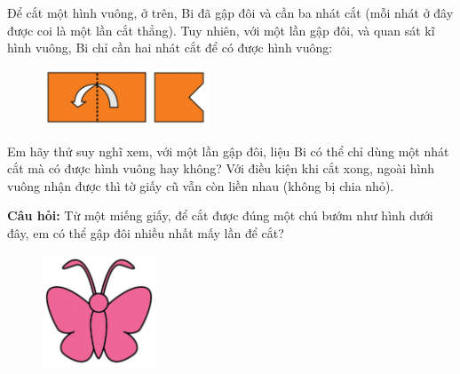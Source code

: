 \begin{multicols}{2}
	Để cắt một hình vuông, ở trên, Bi đã gập đôi và cần ba nhát cắt (mỗi nhát ở đây được coi là một lần cắt thẳng). Tuy nhiên, với một lần gập đôi, và quan sát kĩ hình vuông, Bi chỉ cần hai nhát cắt để có được hình vuông: 
	
	\columnbreak
	\begin{figure}[H]
		\captionsetup{labelformat=empty}
		\vspace*{20pt}
		\centering
		\captionsetup{justification=raggedleft}
		\includegraphics[width =0.44\textwidth]{cat-5}
		\vspace*{-5pt}
	\end{figure}
\end{multicols}
Em hãy thử suy nghĩ xem, với một lần gập đôi, liệu Bi có thể chỉ dùng một nhát cắt mà có  được hình vuông hay không? Với điều kiện khi cắt xong, ngoài hình vuông nhận được thì tờ giấy cũ vẫn còn liền nhau (không bị chia nhỏ).
\vskip 0.1cm
\begin{multicols}{2}
	\textbf{Câu hỏi:} Từ một miếng giấy, để cắt được đúng một chú bướm như hình dưới đây, em có thể gập đôi nhiều nhất mấy lần để cắt?
	
	\columnbreak
	\begin{figure}[H]
		\captionsetup{labelformat=empty}
		\vspace*{-5pt}
		\centering
		\captionsetup{justification=raggedleft}
		\includegraphics[width =0.3\textwidth]{cat-6}
	\end{figure}
\end{multicols}

